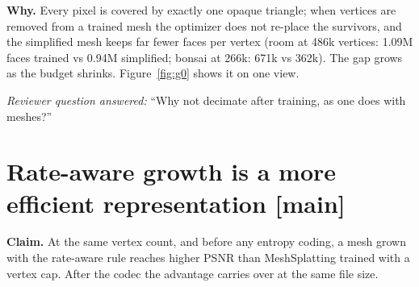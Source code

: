 \documentclass[10pt]{article}
\newcommand{\MS}{MeshSplatting}
\newcommand{\BM}{BudgetMesh}
\begin{document}
\begin{table}[H]\centering\small
\caption{Training with a vertex cap vs.\ simplification after training, at the same vertex count: the vertex counts of \BM{}'s own 20 / 10 / 5 MB files (NeRF-Synthetic: 4 / 2.5 / 1.5 MB). PSNR gain of the trained mesh over the simplified one, after our codec; higher is better for training. Source: batch24-analysis-2026-11-11.md (Deep Blending: batch21-analysis-2026-11-10.md).}
\label{tab:e1}
\end{table}

\noindent\textbf{Why.} Every pixel is covered by exactly one opaque triangle; when vertices are removed from a trained mesh the optimizer does not re-place the survivors, and the simplified mesh keeps far fewer faces per vertex (room at 486k vertices: 1.09M faces trained vs 0.94M simplified; bonsai at 266k: 671k vs 362k). The gap grows as the budget shrinks. Figure~\ref{fig:g0} shows it on one view.

\noindent\textit{Reviewer question answered:} ``Why not decimate after training, as one does with meshes?''

\section{Rate-aware growth is a more efficient representation [main]}
\label{sec:e2}
\textbf{Claim.} At the same vertex count, and before any entropy coding, a mesh grown with the rate-aware rule reaches higher PSNR than \MS{} trained with a vertex cap. After the codec the advantage carries over at the same file size.
\end{document}
